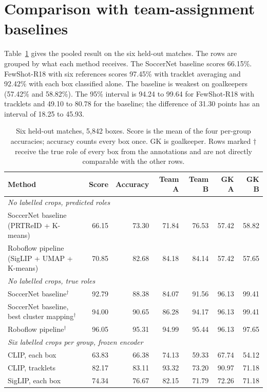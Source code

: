 \documentclass[10pt]{article}
\begin{document}
\section{Comparison with team-assignment baselines}
\label{sec:results}

Table~\ref{tab:main} gives the pooled result on the six held-out matches. The rows are grouped by what each method receives. The SoccerNet baseline scores 66.15\%. FewShot-R18 with six references scores 97.45\% with tracklet averaging and 92.42\% with each box classified alone. The baseline is weakest on goalkeepers (57.42\% and 58.82\%). The 95\% interval is 94.24 to 99.64 for FewShot-R18 with tracklets and 49.10 to 80.78 for the baseline; the difference of 31.30 points has an interval of 18.25 to 45.93.

\begin{table}[tbp]
\centering
\caption{Six held-out matches, 5,842 boxes. Score is the mean of the four per-group accuracies; accuracy counts every box once. GK is goalkeeper. Rows marked $\dagger$ receive the true role of every box from the annotations and are not directly comparable with the other rows.}
\label{tab:main}
\small
\begin{tabular}{lrrrrrr}
\toprule
Method & Score & Accuracy & Team A & Team B & GK A & GK B \\
\midrule
\multicolumn{7}{l}{\emph{No labelled crops, predicted roles}} \\
SoccerNet baseline (PRTReID + K-means) & 66.15 & 73.30 & 71.84 & 76.53 & 57.42 & 58.82 \\
Roboflow pipeline (SigLIP + UMAP + K-means) & 70.85 & 82.68 & 84.18 & 84.14 & 57.42 & 57.65 \\
\midrule
\multicolumn{7}{l}{\emph{No labelled crops, true roles}} \\
SoccerNet baseline$^\dagger$ & 92.79 & 88.38 & 84.07 & 91.56 & 96.13 & 99.41 \\
SoccerNet baseline, best cluster mapping$^\dagger$ & 94.00 & 90.65 & 86.28 & 94.17 & 96.13 & 99.41 \\
Roboflow pipeline$^\dagger$ & 96.05 & 95.31 & 94.99 & 95.44 & 96.13 & 97.65 \\
\midrule
\multicolumn{7}{l}{\emph{Six labelled crops per group, frozen encoder}} \\
CLIP, each box & 63.83 & 66.38 & 74.13 & 59.33 & 67.74 & 54.12 \\
CLIP, tracklets & 82.17 & 83.11 & 93.32 & 73.20 & 90.97 & 71.18 \\
SigLIP, each box & 74.34 & 76.67 & 82.15 & 71.79 & 72.26 & 71.18 \\

\end{tabular}
\end{table}
\end{document}
